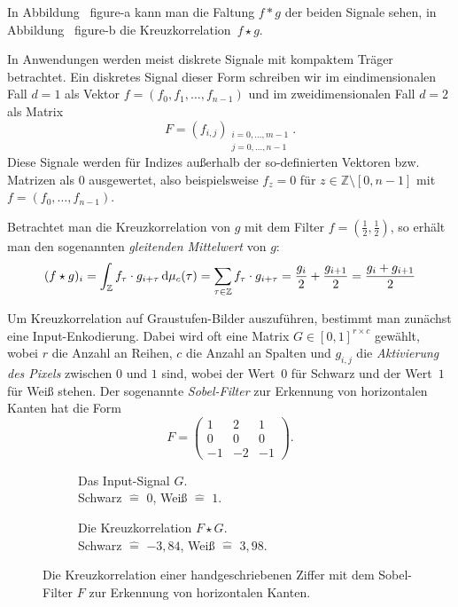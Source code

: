 \documentclass{article}
\theoremstyle{definition}
\newcommand{\Z}{\mathbb{Z}}
\newcommand{\diff}{\,\textrm{d}}
\newcommand{\todo}[1]{{\color{red} #1}}
\begin{document}
In Abbildung~\todo{figure-a} kann man die Faltung $f * g$ der beiden Signale sehen, in Abbildung~\todo{figure-b} die Kreuzkorrelation~$f\star g$.


In Anwendungen werden meist diskrete Signale mit kompaktem Träger betrachtet.
Ein diskretes Signal dieser Form schreiben wir im eindimensionalen Fall $d=1$ als Vektor $f = (f_0, f_1, \dots, f_{n-1})$ und im zweidimensionalen Fall $d=2$ als Matrix $$F = (f_{i,j})_{\substack{i=0,\dots,m-1\\ j=0,\dots, n-1}}.$$
Diese Signale werden für Indizes außerhalb der so-definierten Vektoren bzw. Matrizen als $0$ ausgewertet, also beispielsweise $f_z = 0$ für $z\in\Z\setminus[0,n-1]$ mit $f=(f_0, \dots, f_{n-1})$.

Betrachtet man die Kreuzkorrelation von $g$ mit dem Filter $f=(\frac{1}{2}, \frac{1}{2})$, so erhält man den sogenannten \emph{gleitenden Mittelwert} von $g$:
\[  
    (f \star g)_i = \int_\Z f_\tau \cdot g_{i + \tau} \diff \cmeasure(\tau) 
    = \sum_{\tau\in\Z} f_\tau \cdot g_{i+ \tau}
    = \frac{g_i}{2} + \frac{g_{i+1}}{2} = \frac{g_i + g_{i+1}}{2}
\]

Um Kreuzkorrelation auf Graustufen-Bilder auszuführen, bestimmt man zu\-nächst eine Input-Enkodierung.
Dabei wird oft eine Matrix $G\in[0,1]^{r\times c}$ gewählt, wobei $r$ die Anzahl an Reihen, $c$ die Anzahl an Spalten und $g_{i,j}$ die \emph{Aktivierung des Pixels} zwischen $0$ und $1$ sind, wobei der Wert~$0$ für Schwarz und der Wert~$1$ für Weiß stehen.
Der sogenannte \emph{Sobel-Filter} zur Erkennung von horizontalen Kanten hat die Form
\[
    F = \begin{pmatrix}
        1 & 2 & 1 \\
        0 & 0 & 0 \\ 
        -1 & -2 & -1
    \end{pmatrix}.
\]


\begin{figure}
    \begin{subfigure}{0.5\textwidth}
        \resizebox{\textwidth}{\textwidth}{
        
        }
        \caption{Das Input-Signal $G$.\\Schwarz $\hat=$ $0$, Weiß $\hat=$ $1$.}
    \end{subfigure}%
    \begin{subfigure}{0.5\textwidth}
        \resizebox{0.9285\textwidth}{0.9285\textwidth}{
        
        }
    \caption{Die Kreuzkorrelation $F\star G$.\\Schwarz $\hat=$ $-3{,}84$, Weiß $\hat=$ $3{,}98$.}
    \end{subfigure}
    \caption{Die Kreuzkorrelation einer handgeschriebenen Ziffer mit dem Sobel-Filter $F$ zur Erkennung von horizontalen Kanten.}
    \label{fig:sobel-on-mnist}
\end{figure}
\end{document}
